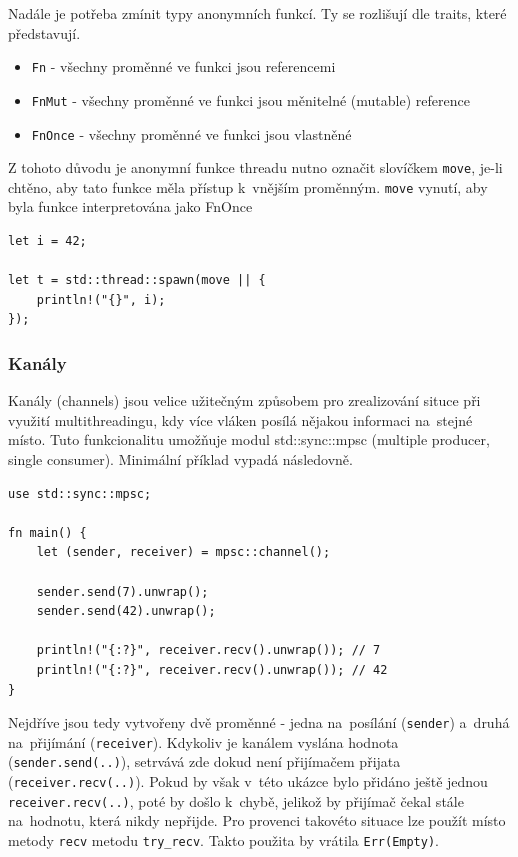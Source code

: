 \documentclass[a4paper, 12pt]{article} %
\newcommand{\rust}[1]{\texttt{#1}}
\begin{document}
        Nadále je potřeba zmínit typy anonymních funkcí. Ty se rozlišují dle traits, které představují.
        \begin{itemize}
            \item \rust{Fn} - všechny proměnné ve funkci jsou referencemi
            \item \rust{FnMut} - všechny proměnné ve funkci jsou měnitelné (mutable) reference
            \item \rust{FnOnce} - všechny proměnné ve funkci jsou vlastněné
        \end{itemize}
        
        Z tohoto důvodu je anonymní funkce threadu nutno označit slovíčkem \rust{move}, je-li chtěno, aby tato funkce měla přístup k~vnějším proměnným. \rust{move} vynutí, aby byla funkce interpretována jako FnOnce
        \begin{verbatim}
let i = 42;

let t = std::thread::spawn(move || {
    println!("{}", i);
});
        \end{verbatim}
        
        \subsubsection*{Kanály}
            Kanály (channels) jsou velice užitečným způsobem pro zrealizování situce při využití multithreadingu, kdy více vláken posílá nějakou informaci na~stejné místo. Tuto funkcionalitu umožňuje modul std::sync::mpsc (multiple producer, single consumer). Minimální příklad vypadá následovně.
            \begin{verbatim}
use std::sync::mpsc;

fn main() {
    let (sender, receiver) = mpsc::channel();
    
    sender.send(7).unwrap();
    sender.send(42).unwrap();

    println!("{:?}", receiver.recv().unwrap()); // 7
    println!("{:?}", receiver.recv().unwrap()); // 42
}
            \end{verbatim}
            
            Nejdříve jsou tedy vytvořeny dvě proměnné - jedna na~posílání (\rust{sender}) a~druhá na~přijímání (\rust{receiver}). Kdykoliv je kanálem vyslána hodnota \linebreak(\rust{sender.send(..)}), setrvává zde dokud není přijímačem přijata \linebreak(\rust{receiver.recv(..)}). Pokud by však v~této ukázce bylo přidáno ještě jednou \rust{receiver.recv(..)}, poté by došlo k~chybě, jelikož by přijímač čekal stále na~hodnotu, která nikdy nepřijde. Pro provenci takovéto situace lze použít místo metody \rust{recv} metodu \rust{try_recv}. Takto použita by vrátila \rust{Err(Empty)}.
            
\end{document}
